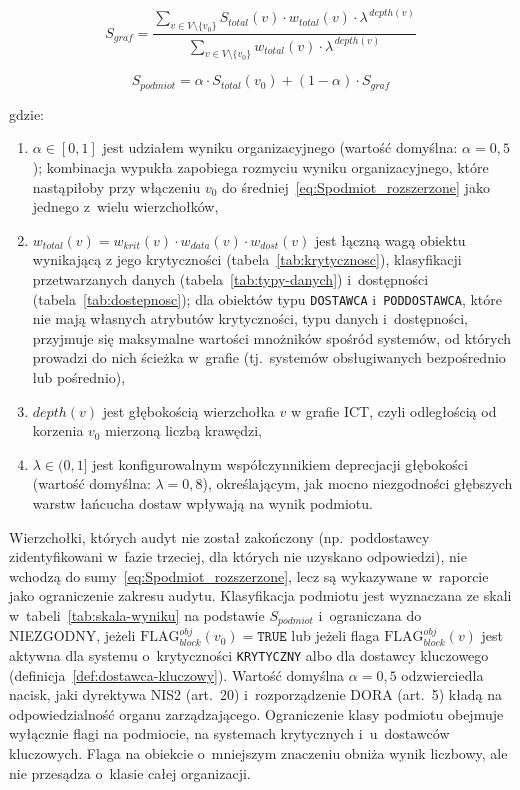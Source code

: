 \begin{equation}
S_{graf} =
\frac{\displaystyle\sum_{v \in V \setminus \{v_0\}}
      S_{total}(v)
      \cdot w_{total}(v)
      \cdot \lambda^{\,depth(v)}}
     {\displaystyle\sum_{v \in V \setminus \{v_0\}}
      w_{total}(v)
      \cdot \lambda^{\,depth(v)}}
\label{eq:Spodmiot_rozszerzone}
\end{equation}

\begin{equation}
S_{podmiot} = \alpha \cdot S_{total}(v_0) + (1 - \alpha) \cdot S_{graf}
\label{eq:Spodmiot-final}
\end{equation}

\noindent gdzie:
\begin{enumerate}[label=(\roman*)]
  \item $\alpha \in [0, 1]$ jest udziałem wyniku organizacyjnego
  (wartość domyślna: $\alpha = 0{,}5$); kombinacja wypukła zapobiega
  rozmyciu wyniku organizacyjnego, które nastąpiłoby przy włączeniu
  $v_0$ do średniej~\eqref{eq:Spodmiot_rozszerzone} jako jednego
  z~wielu wierzchołków,
  \item $w_{total}(v) = w_{krit}(v) \cdot w_{data}(v) \cdot w_{dost}(v)$
  jest łączną wagą obiektu wynikającą z jego
  krytyczności (tabela~\ref{tab:krytycznosc}), klasyfikacji
  przetwarzanych danych (tabela~\ref{tab:typy-danych})
  i~dostępności (tabela~\ref{tab:dostepnosc});
  dla obiektów typu \texttt{DOSTAWCA} i~\texttt{PODDOSTAWCA},
  które nie mają własnych atrybutów krytyczności, typu danych
  i~dostępności, przyjmuje się maksymalne wartości mnożników
  spośród systemów, od których prowadzi do nich ścieżka w~grafie
  (tj.\ systemów obsługiwanych bezpośrednio lub pośrednio),
  \item $depth(v)$ jest głębokością wierzchołka $v$
  w grafie ICT, czyli odległością od korzenia $v_0$
  mierzoną liczbą krawędzi,
  \item $\lambda \in (0, 1]$ jest konfigurowalnym
  współczynnikiem deprecjacji głębokości
  (wartość domyślna: $\lambda = 0{,}8$),
  określającym, jak mocno niezgodności głębszych
  warstw łańcucha dostaw wpływają na wynik podmiotu.
\end{enumerate}

\noindent Wierzchołki, których audyt nie został zakończony
(np.\ poddostawcy zidentyfikowani w~fazie trzeciej, dla których
nie uzyskano odpowiedzi), nie wchodzą do sumy~\eqref{eq:Spodmiot_rozszerzone},
lecz są wykazywane w~raporcie jako ograniczenie zakresu audytu.
Klasyfikacja podmiotu jest wyznaczana ze skali
w~tabeli~\ref{tab:skala-wyniku} na podstawie $S_{podmiot}$
i~ograniczana do \textsc{NIEZGODNY}, jeżeli
$\text{FLAG}_{block}^{obj}(v_0) = \texttt{TRUE}$ lub jeżeli flaga
$\text{FLAG}_{block}^{obj}(v)$ jest aktywna dla systemu
o~krytyczności \texttt{KRYTYCZNY} albo dla dostawcy kluczowego
(definicja~\ref{def:dostawca-kluczowy}).
Wartość domyślna $\alpha = 0{,}5$ odzwierciedla nacisk, jaki dyrektywa NIS2 (art.~20) i~rozporządzenie DORA (art.~5) kładą na odpowiedzialność organu zarządzającego. Ograniczenie klasy podmiotu obejmuje wyłącznie flagi na podmiocie, na systemach krytycznych i~u~dostawców kluczowych. Flaga na obiekcie o~mniejszym znaczeniu obniża wynik liczbowy, ale nie przesądza o~klasie całej organizacji.


